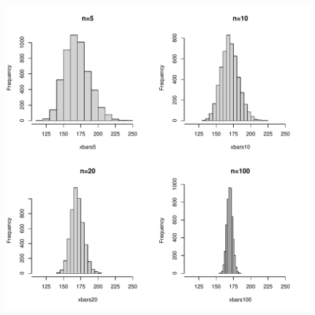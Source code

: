 \documentclass[fleqn]{article}\usepackage[]{graphicx}\usepackage[]{color}
\makeatletter
\def\maxwidth{ %
  \ifdim\Gin@nat@width>\linewidth
    \linewidth
  \else
    \Gin@nat@width
  \fi
}
\newenvironment{knitrout}{}{} %
\makeatother
\begin{document}
\begin{knitrout}
\includegraphics[width=\maxwidth]{figure/unnamed-chunk-7-1} 
\end{knitrout}
\clearpage
\end{document}
